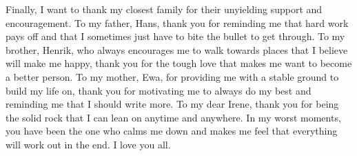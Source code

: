 \noindent Finally, I want to thank my closest family for their unyielding support and encouragement. To my father, Hans, thank you for reminding me that hard work pays off and that I sometimes just have to bite the bullet to get through. 
To my brother, Henrik, who always encourages me to walk towards places that I believe will make me happy, thank you for the tough love that makes me want to become a better person. 
To my mother, Ewa, for providing me with a stable ground to build my life on, thank you for motivating me to always do my best and reminding me that I should write more. 
To my dear Irene, thank you for being the solid rock that I can lean on anytime and anywhere. %
In my worst moments, you have been the one who calms me down and makes me feel that everything will work out in the end. 
I love you all.




